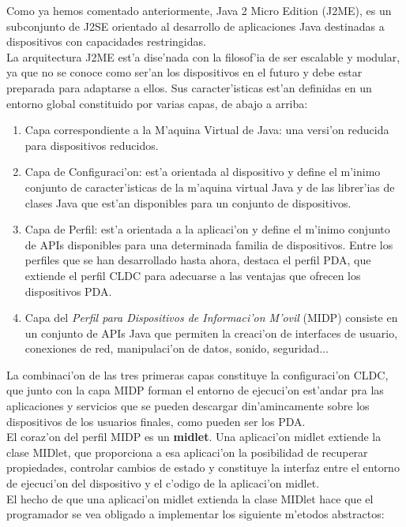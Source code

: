 Como ya hemos comentado anteriormente, Java 2 Micro Edition (J2ME), es un subconjunto de J2SE orientado al desarrollo de aplicaciones Java destinadas a dispositivos con capacidades restringidas. \bigskip \\ La arquitectura J2ME est'a dise'nada con la filosof'ia de ser escalable y modular, ya que no se conoce como ser'an los dispositivos en el futuro y debe estar preparada para adaptarse a ellos. Sus caracter'isticas est'an definidas en un entorno global constituido por varias capas, de abajo a arriba:

\begin{enumerate}
\item Capa correspondiente a la M'aquina Virtual de Java: una versi'on reducida para dispositivos reducidos.
\item Capa de Configuraci'on: est'a orientada al dispositivo y define el m'inimo conjunto de caracter'isticas de la m'aquina virtual Java y de las librer'ias de clases Java que est'an disponibles para un conjunto de dispositivos.
\item Capa de Perfil: est'a orientada a la aplicaci'on y define el m'inimo conjunto de APIs disponibles para una determinada familia de dispositivos. Entre los perfiles que se han desarrollado hasta ahora, destaca el perfil PDA, que extiende el perfil CLDC para adecuarse a las ventajas que ofrecen los dispositivos PDA.
\item Capa del \textit{Perfil para Dispositivos de Informaci'on M'ovil} (MIDP) consiste en un conjunto de APIs Java que permiten la creaci'on de interfaces de usuario, conexiones de red, manipulaci'on de datos, sonido, seguridad...
\end{enumerate}

La combinaci'on de las tres primeras capas constituye la configuraci'on CLDC, que junto con la capa MIDP forman el entorno de ejecuci'on est'andar pra las aplicaciones y servicios que se pueden descargar din'amincamente sobre los dispositivos de los usuarios finales, como pueden ser los PDA. \bigskip \\ El coraz'on del perfil MIDP es un \textbf{midlet}. Una aplicaci'on midlet extiende la clase MIDlet, que proporciona a esa aplicaci'on la posibilidad de recuperar propiedades, controlar cambios de estado y constituye la interfaz entre el entorno de ejecuci'on del dispositivo y el c'odigo de la aplicaci'on midlet.\bigskip \\ El hecho de que una aplicaci'on midlet extienda la clase MIDlet hace que el programador se vea obligado a implementar los siguiente m'etodos abstractos:

